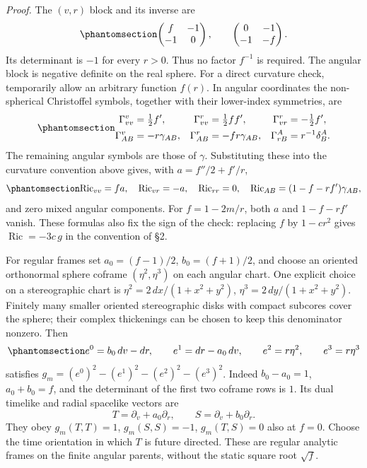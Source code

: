 \documentclass[
  english,
  11pt,
  reqno]{amsart}
\begin{document}
\emph{Proof.} The \((v,r)\) block and its inverse are
\begin{equation}\protect\phantomsection\label{eq:schw-bc-ef-blocks}{
 \begin{pmatrix}f&-1\\-1&0\end{pmatrix},\qquad
 \begin{pmatrix}0&-1\\-1&-f\end{pmatrix}.
}\end{equation} Its determinant is \(-1\) for every \(r>0\). Thus no
factor \(f^{-1}\) is required. The angular block is negative definite on
the real sphere. For a direct curvature check, temporarily allow an
arbitrary function \(f(r)\). In angular coordinates the non-spherical
Christoffel symbols, together with their lower-index symmetries, are
\begin{equation}\protect\phantomsection\label{eq:schw-bc-ef-connection}{
 \begin{aligned}
 \Gamma^v_{vv}&=\tfrac12f',&
 \Gamma^r_{vv}&=\tfrac12ff',&
 \Gamma^r_{vr}&=-\tfrac12f',\\
 \Gamma^v_{AB}&=-r\gamma_{AB},&
 \Gamma^r_{AB}&=-fr\gamma_{AB},&
 \Gamma^A_{rB}&=r^{-1}\delta^A_B.
 \end{aligned}
}\end{equation} The remaining angular symbols are those of \(\gamma\).
Substituting these into the curvature convention above gives, with
\(a=f''/2+f'/r\),
\begin{equation}\protect\phantomsection\label{eq:schw-bc-ef-ricci}{
 \operatorname{Ric}_{vv}=fa,\quad
 \operatorname{Ric}_{vr}=-a,\quad
 \operatorname{Ric}_{rr}=0,\quad
 \operatorname{Ric}_{AB}=(1-f-rf')\gamma_{AB},
}\end{equation} and zero mixed angular components. For \(f=1-2m/r\),
both \(a\) and \(1-f-rf'\) vanish. These formulas also fix the sign of
the check: replacing \(f\) by \(1-cr^2\) gives
\(\operatorname{Ric}=-3c\,g\) in the convention of §2.

For regular frames set \(a_0=(f-1)/2\), \(b_0=(f+1)/2\), and choose an
oriented orthonormal sphere coframe \((\eta^2,\eta^3)\) on each angular
chart. One explicit choice on a stereographic chart is
\(\eta^2=2\,dx/(1+x^2+y^2)\), \(\eta^3=2\,dy/(1+x^2+y^2)\). Finitely
many smaller oriented stereographic disks with compact subcores cover
the sphere; their complex thickenings can be chosen to keep this
denominator nonzero. Then
\begin{equation}\protect\phantomsection\label{eq:schw-bc-regular-coframe}{
 e^0=b_0\,dv-dr,\qquad
 e^1=dr-a_0\,dv,\qquad
 e^2=r\eta^2,\qquad e^3=r\eta^3
}\end{equation} satisfies \(g_m=(e^0)^2-(e^1)^2-(e^2)^2-(e^3)^2\).
Indeed \(b_0-a_0=1\), \(a_0+b_0=f\), and the determinant of the first
two coframe rows is \(1\). Its dual timelike and radial spacelike
vectors are \[
 T=\partial_v+a_0\partial_r,\qquad
 S=\partial_v+b_0\partial_r.
\] They obey \(g_m(T,T)=1\), \(g_m(S,S)=-1\), \(g_m(T,S)=0\) also at
\(f=0\). Choose the time orientation in which \(T\) is future directed.
These are regular analytic frames on the finite angular parents, without
the static square root \(\sqrt f\).
\end{document}

